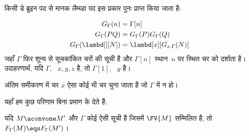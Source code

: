 \documentclass[../../../include/open-logic-section]{subfiles}
\begin{document}
किसी डे ब्रुइन पद से मानक लैम्ब्डा पद इस प्रकार पुनः प्राप्त किया जाता है:

\begin{defn}
  \begin{align*}
    G_\Gamma(n) &= \Gamma[n] \\
    G_\Gamma(PQ) &= G_\Gamma(P) G_\Gamma(Q) \\
    G_\Gamma(\lambd[][N]) &= \lambd[x][G_{x,\Gamma}(N)]
  \end{align*}
  जहाँ $\Gamma$ फिर शून्य से सूचकांकित चरों की सूची है और $\Gamma[n]$
  स्थान~$n$ पर स्थित चर को दर्शाता है। उदाहरणार्थ, यदि $\Gamma$,
  ~$x,y,z$ है, तो $\Gamma[1]$, ~$y$ है।

  अंतिम समीकरण में चर $x$ ऐसा कोई भी चर चुना जाता है जो $\Gamma$ में न हो।
\end{defn}

यहाँ हम कुछ परिणाम बिना प्रमाण के देते हैं:

\begin{prop}
  यदि $M \aconvone M'$ और $\Gamma$ कोई ऐसी सूची है जिसमें $\FV{M}$
  सम्मिलित है, तो $F_\Gamma(M) \eqs F_\Gamma(M')$।
\end{prop}
\end{document}
